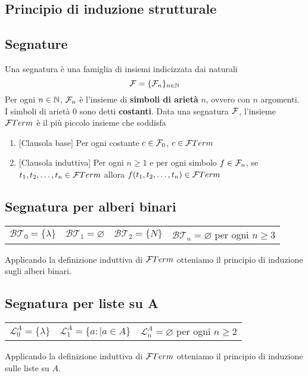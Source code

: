 \documentclass{article}
\begin{document}
\subsection{Principio di induzione strutturale}
\subsection*{Segnature}
Una segnatura è una famiglia di insiemi indicizzata dai naturali
\[\mathcal{F} = \{\mathcal{F}_n\}_{n \in \mathbb{N}}\]
Per ogni \(n \in \mathbb{N}\), \(\mathcal{F}_n\) è l'insieme di \textbf{simboli di arietà} \(n\), ovvero con \(n\) argomenti. I simboli di arietà 0 sono detti \textbf{costanti}. Data una segnatura \(\mathcal{F}\), l'insieme \(\mathcal{F}Term\) è il più piccolo insieme che soddisfa
\begin{enumerate}
    \item {[Clausola base]} Per ogni costante \(c \in \mathcal{F}_0\), \(c \in \mathcal{F}Term\)
    \item {[Clausola induttiva]} Per ogni \(n \geq 1\) e per ogni simbolo \(f \in \mathcal{F}_n\), se \(t_1, t_2, \ldots, t_n \in \mathcal{F}Term\) allora \(f(t_1, t_2, \ldots, t_n) \in \mathcal{F}Term\)
\end{enumerate}
\subsection*{Segnatura per alberi binari}
\begin{center}
    \begin{tabular}{cccc}
        \(\mathcal{BT}_0 = \{\lambda\}\) & \(\mathcal{BT}_1 = \varnothing\) & \(\mathcal{BT}_2 = \{N\}\) & \(\mathcal{BT}_n = \varnothing\) per ogni \(n \geq 3\)
    \end{tabular}
\end{center}
Applicando la definizione induttiva di \(\mathcal{F}Term\) otteniamo il principio di induzione sugli alberi binari.
\subsection*{Segnatura per liste su A}
\begin{center}
    \begin{tabular}{ccc}
        \(\mathcal{L}^A_0 = \{\lambda\}\) & \(\mathcal{L}^A_1 = \{a: \mid a \in A\}\) & \(\mathcal{L}^A_n = \varnothing\) per ogni \(n \geq 2\)
    \end{tabular}
\end{center}
Applicando la definizione induttiva di \(\mathcal{F}Term\) otteniamo il principio di induzione sulle liste su \(A\).
\end{document}
